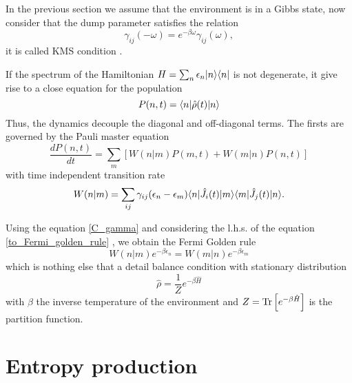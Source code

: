 In the previous section we assume that the environment is in a Gibbs state, now consider that the dump parameter satisfies the relation
\begin{equation}\label{C_gamma}
    \gamma_{ij}(-\omega) = e^{-\beta \omega}\gamma_{ij}(\omega),
\end{equation}
it is called KMS condition \cite{Breuer-Petruccione}.

If the spectrum of the Hamiltonian $H = \sum_n \epsilon_n\lvert n\rangle\langle n\rvert$ is not degenerate, it give rise to a close equation for the population 
\begin{equation}
    P(n,t) = \langle n\rvert\hat\rho(t)\lvert n\rangle
\end{equation}
Thus, the dynamics decouple the diagonal and off-diagonal terms. The firsts are governed by the Pauli master equation
\begin{equation}\label{to_Fermi_golden_rule}
    \frac{dP(n,t)}{dt} = \sum_m \left[ W(n|m)P(m,t) + W(m|n)P(n,t)\right]
\end{equation}
with time independent transition rate
\begin{equation}
    W(n|m) = \sum_{ij} \gamma_{ij}(\epsilon_n -\epsilon_m)\langle n\rvert\hat J_i(t)\lvert m\rangle \langle m\rvert\hat J_j(t)\lvert n\rangle. 
\end{equation}

Using the equation \eqref{C_gamma} and considering the l.h.s. of the equation \eqref{to_Fermi_golden_rule} , we obtain the Fermi Golden rule
\begin{equation}
    W(n|m)e^{-\beta \epsilon_n} = W(m|n) e^{-\beta \epsilon_m}
\end{equation}
which is nothing else that a detail balance condition with stationary distribution
\begin{equation}
    \hat\rho = \frac{1}{Z}e^{-\beta \hat H}
\end{equation}
with $\beta$ the inverse temperature of the environment and $Z = \operatorname{Tr}\left[e^{-\beta \hat H}\right]$ is the partition function.

\section{Entropy production}

